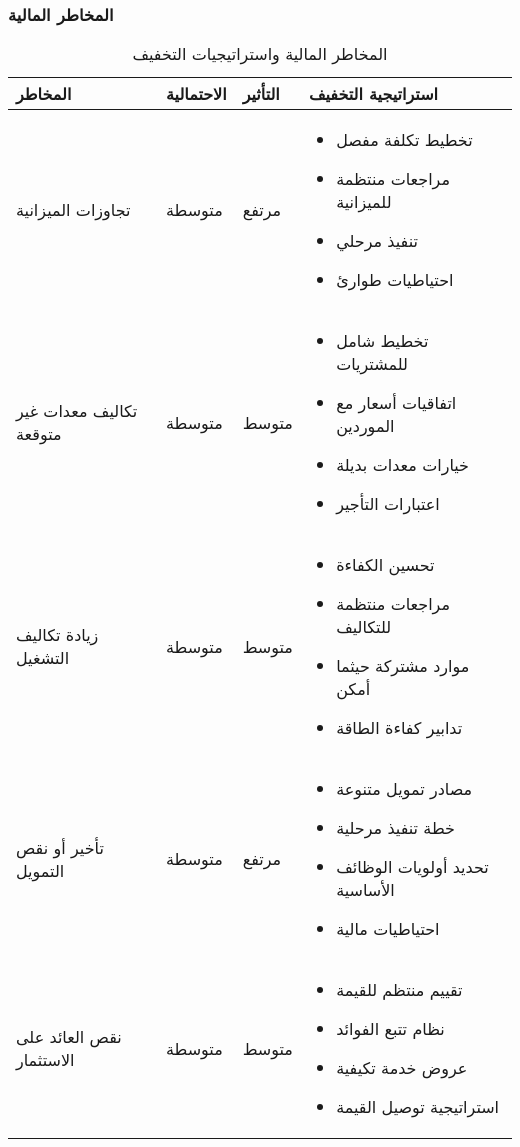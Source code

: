 \subsubsection{المخاطر المالية}
\begin{table}[H]
\centering
\begin{tabular}{|p{3cm}|p{2cm}|p{2cm}|p{7cm}|}
\hline
\textbf{المخاطر} & \textbf{الاحتمالية} & \textbf{التأثير} & \textbf{استراتيجية التخفيف} \\
\hline
تجاوزات الميزانية & متوسطة & مرتفع & 
\begin{itemize}
    \item تخطيط تكلفة مفصل
    \item مراجعات منتظمة للميزانية
    \item تنفيذ مرحلي
    \item احتياطيات طوارئ
\end{itemize} \\
\hline
تكاليف معدات غير متوقعة & متوسطة & متوسط & 
\begin{itemize}
    \item تخطيط شامل للمشتريات
    \item اتفاقيات أسعار مع الموردين
    \item خيارات معدات بديلة
    \item اعتبارات التأجير
\end{itemize} \\
\hline
زيادة تكاليف التشغيل & متوسطة & متوسط & 
\begin{itemize}
    \item تحسين الكفاءة
    \item مراجعات منتظمة للتكاليف
    \item موارد مشتركة حيثما أمكن
    \item تدابير كفاءة الطاقة
\end{itemize} \\
\hline
تأخير أو نقص التمويل & متوسطة & مرتفع & 
\begin{itemize}
    \item مصادر تمويل متنوعة
    \item خطة تنفيذ مرحلية
    \item تحديد أولويات الوظائف الأساسية
    \item احتياطيات مالية
\end{itemize} \\
\hline
نقص العائد على الاستثمار & متوسطة & متوسط & 
\begin{itemize}
    \item تقييم منتظم للقيمة
    \item نظام تتبع الفوائد
    \item عروض خدمة تكيفية
    \item استراتيجية توصيل القيمة
\end{itemize} \\
\hline
\end{tabular}
\caption{المخاطر المالية واستراتيجيات التخفيف}
\end{table}

